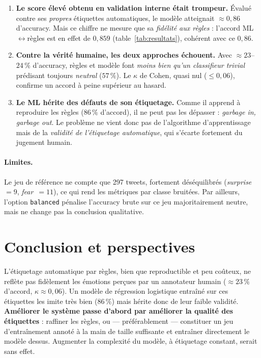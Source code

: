 \documentclass[11pt,a4paper]{article}
\begin{document}
\begin{enumerate}
  \item \textbf{Le score élevé obtenu en validation interne était trompeur.}
  Évalué contre ses \emph{propres} étiquettes automatiques, le modèle atteignait
  $\approx 0,86$ d'accuracy. Mais ce chiffre ne mesure que sa \emph{fidélité aux
  règles} : l'accord ML$\leftrightarrow$règles est en effet de $0,859$
  (table~\ref{tab:resultats}), cohérent avec ce $0,86$.

  \item \textbf{Contre la vérité humaine, les deux approches échouent.}
  Avec $\approx 23$--$24\,\%$ d'accuracy, règles et modèle font \emph{moins bien
  qu'un classifieur trivial} prédisant toujours \emph{neutral} ($57\,\%$).
  Le $\kappa$ de Cohen, quasi nul ($\le 0,06$), confirme un accord à peine
  supérieur au hasard.

  \item \textbf{Le ML hérite des défauts de son étiquetage.}
  Comme il apprend à reproduire les règles ($86\,\%$ d'accord), il ne peut pas
  les dépasser : \emph{garbage in, garbage out}. Le problème ne vient donc pas de
  l'algorithme d'apprentissage mais de la \emph{validité de l'étiquetage
  automatique}, qui s'écarte fortement du jugement humain.
\end{enumerate}

\paragraph{Limites.}
Le jeu de référence ne compte que 297 tweets, fortement déséquilibrés
(\emph{surprise}~$=9$, \emph{fear}~$=11$), ce qui rend les métriques par classe
bruitées. Par ailleurs, l'option \texttt{balanced} pénalise l'accuracy brute sur
ce jeu majoritairement neutre, mais ne change pas la conclusion qualitative.

\section{Conclusion et perspectives}

L'étiquetage automatique par règles, bien que reproductible et peu coûteux, ne
reflète pas fidèlement les émotions perçues par un annotateur humain
($\approx 23\,\%$ d'accord, $\kappa \approx 0,06$). Un modèle de régression
logistique entraîné sur ces étiquettes les imite très bien ($86\,\%$) mais hérite
donc de leur faible validité. \textbf{Améliorer le système passe d'abord par
améliorer la qualité des étiquettes} : raffiner les règles, ou — préférablement —
constituer un jeu d'entraînement annoté à la main de taille suffisante et
entraîner directement le modèle dessus. Augmenter la complexité du modèle, à
étiquetage constant, serait sans effet.
\end{document}
